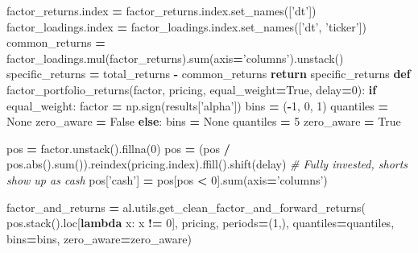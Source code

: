\documentclass[11,]{article}
\newenvironment{Shaded}{\begin{snugshade}}{\end{snugshade}}
\newcommand{\BuiltInTok}[1]{#1}
\newcommand{\CommentTok}[1]{\textcolor[rgb]{0.56,0.35,0.01}{\textit{#1}}}
\newcommand{\ControlFlowTok}[1]{\textcolor[rgb]{0.13,0.29,0.53}{\textbf{#1}}}
\newcommand{\DecValTok}[1]{\textcolor[rgb]{0.00,0.00,0.81}{#1}}
\newcommand{\KeywordTok}[1]{\textcolor[rgb]{0.13,0.29,0.53}{\textbf{#1}}}
\newcommand{\NormalTok}[1]{#1}
\newcommand{\OperatorTok}[1]{\textcolor[rgb]{0.81,0.36,0.00}{\textbf{#1}}}
\newcommand{\StringTok}[1]{\textcolor[rgb]{0.31,0.60,0.02}{#1}}
\newcommand{\VariableTok}[1]{\textcolor[rgb]{0.00,0.00,0.00}{#1}}
\begin{document}
\begin{Shaded}
\begin{Highlighting}[]
\NormalTok{    factor_returns.index }\OperatorTok{=}\NormalTok{ factor_returns.index.set_names([}\StringTok{'dt'}\NormalTok{])}
\NormalTok{    factor_loadings.index }\OperatorTok{=}\NormalTok{ factor_loadings.index.set_names([}\StringTok{'dt'}\NormalTok{, }\StringTok{'ticker'}\NormalTok{])}
\NormalTok{    common_returns }\OperatorTok{=}\NormalTok{ factor_loadings.mul(factor_returns).}\BuiltInTok{sum}\NormalTok{(axis}\OperatorTok{=}\StringTok{'columns'}\NormalTok{).unstack()}
\NormalTok{    specific_returns }\OperatorTok{=}\NormalTok{ total_returns }\OperatorTok{-}\NormalTok{ common_returns}
    \ControlFlowTok{return}\NormalTok{ specific_returns}
\KeywordTok{def}\NormalTok{ factor_portfolio_returns(factor, pricing, equal_weight}\OperatorTok{=}\VariableTok{True}\NormalTok{, delay}\OperatorTok{=}\DecValTok{0}\NormalTok{):}
    \ControlFlowTok{if}\NormalTok{ equal_weight:}
\NormalTok{        factor }\OperatorTok{=}\NormalTok{ np.sign(results[}\StringTok{'alpha'}\NormalTok{])}
\NormalTok{        bins }\OperatorTok{=}\NormalTok{ (}\OperatorTok{-}\DecValTok{1}\NormalTok{, }\DecValTok{0}\NormalTok{, }\DecValTok{1}\NormalTok{)}
\NormalTok{        quantiles }\OperatorTok{=} \VariableTok{None}
\NormalTok{        zero_aware }\OperatorTok{=} \VariableTok{False}
    \ControlFlowTok{else}\NormalTok{:}
\NormalTok{        bins }\OperatorTok{=} \VariableTok{None}
\NormalTok{        quantiles }\OperatorTok{=} \DecValTok{5}
\NormalTok{        zero_aware }\OperatorTok{=} \VariableTok{True}
        
\NormalTok{    pos }\OperatorTok{=}\NormalTok{ factor.unstack().fillna(}\DecValTok{0}\NormalTok{)}
\NormalTok{    pos }\OperatorTok{=}\NormalTok{ (pos }\OperatorTok{/}\NormalTok{ pos.}\BuiltInTok{abs}\NormalTok{().}\BuiltInTok{sum}\NormalTok{()).reindex(pricing.index).ffill().shift(delay)}
    \CommentTok{# Fully invested, shorts show up as cash}
\NormalTok{    pos[}\StringTok{'cash'}\NormalTok{] }\OperatorTok{=}\NormalTok{ pos[pos }\OperatorTok{<} \DecValTok{0}\NormalTok{].}\BuiltInTok{sum}\NormalTok{(axis}\OperatorTok{=}\StringTok{'columns'}\NormalTok{)}
    
\NormalTok{    factor_and_returns }\OperatorTok{=}\NormalTok{ al.utils.get_clean_factor_and_forward_returns(}
\NormalTok{        pos.stack().loc[}\KeywordTok{lambda}\NormalTok{ x: x }\OperatorTok{!=} \DecValTok{0}\NormalTok{], }
\NormalTok{        pricing, periods}\OperatorTok{=}\NormalTok{(}\DecValTok{1}\NormalTok{,), quantiles}\OperatorTok{=}\NormalTok{quantiles, bins}\OperatorTok{=}\NormalTok{bins, }
\NormalTok{        zero_aware}\OperatorTok{=}\NormalTok{zero_aware)}
    

\end{Highlighting}
\end{Shaded}
\end{document}
